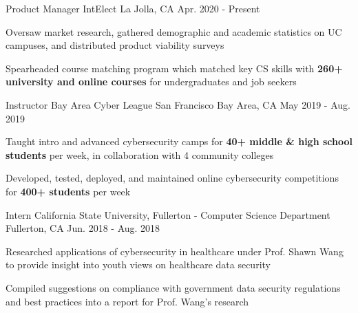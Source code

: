 

\begin{cventries}

  \cventry
    {Product Manager} %
    {IntElect} %
    {La Jolla, CA} %
    {Apr. 2020 - Present} %
    {
      \begin{cvitems} %
        \item {Oversaw market research, gathered demographic and academic statistics on UC campuses, and distributed product viability surveys}
        \item {Spearheaded course matching program which matched key CS skills with \textbf{260+ university and online courses} for undergraduates and job seekers}
      \end{cvitems}
    }

  \cventry
    {Instructor} %
    {Bay Area Cyber League} %
    {San Francisco Bay Area, CA} %
    {May 2019 - Aug. 2019} %
    {
      \begin{cvitems} %
        \item {Taught intro and advanced cybersecurity camps for \textbf{40+ middle \& high school students} per week, in collaboration with 4 community colleges}
        \item {Developed, tested, deployed, and maintained online cybersecurity competitions for \textbf{400+ students} per week}
      \end{cvitems}
    }

  \cventry
    {Intern} %
    {California State University, Fullerton - Computer Science Department} %
    {Fullerton, CA} %
    {Jun. 2018 - Aug. 2018} %
    {
      \begin{cvitems} %
        \item {Researched applications of cybersecurity in healthcare under Prof. Shawn Wang to provide insight into youth views on healthcare data security}
        \item {Compiled suggestions on compliance with government data security regulations and best practices into a report for Prof. Wang's research}
      \end{cvitems}
    }

\end{cventries}
